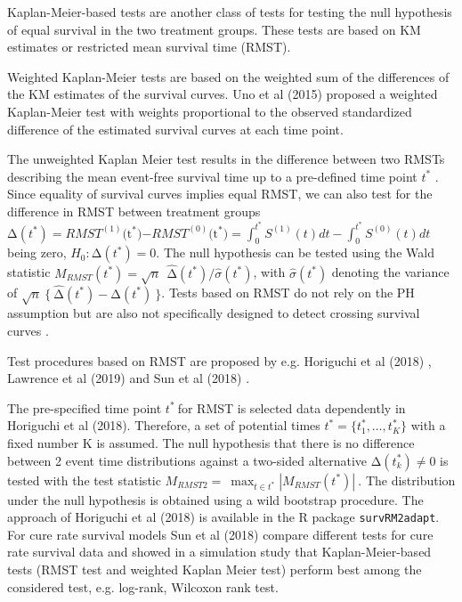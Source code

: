 \noindent 

\noindent Kaplan-Meier-based tests are another class of tests for testing the null hypothesis of equal survival in the two treatment groups. These tests are based on KM estimates or restricted mean survival time (RMST). 

\noindent Weighted Kaplan-Meier tests are based on the weighted sum of the differences of the KM estimates of the survival curves. Uno et al (2015) \cite{Uno.2015} proposed a weighted Kaplan-Meier test with weights proportional to the observed standardized difference of the estimated survival curves at each time point. 

\noindent The unweighted Kaplan Meier test results in the difference between two RMSTs describing the mean event-free survival time up to a pre-defined time point $t^*$  \cite{Dormuth.2022}. Since equality of survival curves implies equal RMST, we can also test for the difference in RMST between treatment groups $\mathrm{\Delta }\left(t^*\right)=RMST^{\left(1\right)}\mathrm{(}{\mathrm{t}}^{\mathrm{*}}\mathrm{)}\mathrm{-}RMST^{\left(0\right)}\mathrm{(}{\mathrm{t}}^{\mathrm{*}}\mathrm{)=}\int^{t^*}_0{S^{(1)}\left(t\right)dt-\int^{t^*}_0{S^{(0)}\left(t\right)dt}}$  being zero, $H_0:\mathrm{\Delta }\left(t^*\right)=0$. The null hypothesis can be tested using the Wald statistic $M_{RMST}\left(t^*\right)=\sqrt{n}\mathrm{\ \ }\widehat{\mathrm{\Delta }}\left(t^*\right)/\widehat{\sigma }(t^*)$, with $\widehat{\sigma }\left(t^*\right)$ denoting the variance of  $\sqrt{n}\mathrm{\ }\mathrm{\{}\mathrm{\ }\widehat{\mathrm{\Delta }}\left(t^*\right)-\mathrm{\Delta }\left(t^*\right)\ \}$. Tests based on RMST do not rely on the PH assumption but are also not specifically designed to detect crossing survival curves \cite{Dormuth.2022}.

\noindent Test procedures based on RMST are proposed by e.g. Horiguchi et al (2018) \cite{Horiguchi.2018}, Lawrence et al (2019) \cite{Lawrence.2019} and Sun et al (2018) \cite{Sun.2018}.

\noindent The pre-specified time point $t^*\ $for RMST is selected data dependently in Horiguchi et al (2018). Therefore, a set of potential times $t^*=\{t^*_1,\dots,t^*_K\}$ with a fixed number K is assumed. The null hypothesis that there is no difference between 2 event time distributions against a two-sided alternative $\mathrm{\Delta }\left(t^*_k\right)\neq 0$ is tested with the test statistic $M_{RMST2}=\ {\mathop{\mathrm{max}}_{t\in t^*} |M_{RMST}\left(t^*\right)|\ }$. The distribution under the null hypothesis is obtained using a wild bootstrap procedure. The approach of Horiguchi et al (2018) \cite{Horiguchi.2018} is available in the R package \texttt{survRM2adapt}. For cure rate survival models Sun et al (2018) \cite{Sun.2018} compare different tests for cure rate survival data and showed in a simulation study that Kaplan-Meier-based tests (RMST test and weighted Kaplan Meier test) perform best among the considered test, e.g. log-rank, Wilcoxon rank test.

